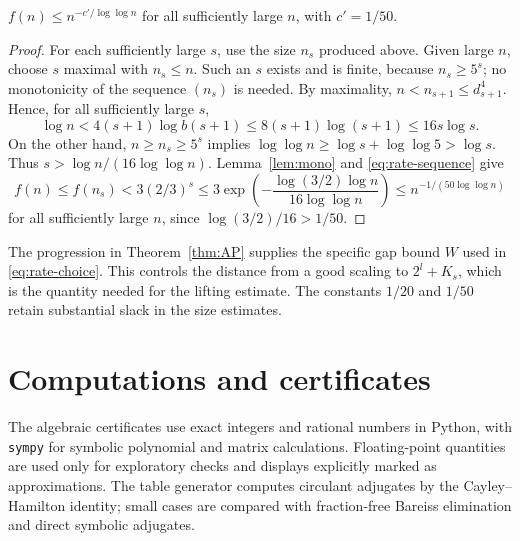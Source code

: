 \documentclass[12pt]{article}
\begin{document}
\begin{corollary}\label{cor:rate-all}
$f(n)\le n^{-c'/\log\log n}$ for all sufficiently large $n$, with $c'=1/50$.
\end{corollary}
\begin{proof}
For each sufficiently large $s$, use the size $n_s$ produced above.
Given large $n$, choose $s$ maximal with $n_s\le n$.
Such an $s$ exists and is finite, because $n_s\ge5^s$; no monotonicity of the
sequence $(n_s)$ is needed. By maximality,
$n<n_{s+1}\le d_{s+1}^4$. Hence, for all sufficiently large $s$,
\[
\log n<4(s+1)\log b(s+1)
\le8(s+1)\log(s+1)\le16s\log s.
\]
On the other hand, $n\ge n_s\ge5^s$ implies
$\log\log n\ge\log s+\log\log5>\log s$.
Thus $s>\log n/(16\log\log n)$.
Lemma~\ref{lem:mono} and \eqref{eq:rate-sequence} give
\[
f(n)\le f(n_s)<3(2/3)^s
\le3\exp\left(-\frac{\log(3/2)\log n}{16\log\log n}\right)
\le n^{-1/(50\log\log n)}
\]
for all sufficiently large $n$, since $\log(3/2)/16>1/50$.
\end{proof}

The progression in Theorem~\ref{thm:AP} supplies the specific gap bound $W$
used in \eqref{eq:rate-choice}. This controls the distance from a good scaling
to $2^l+K_s$, which is the quantity needed for the lifting estimate.
The constants $1/20$ and $1/50$ retain substantial slack in the size estimates.

\section{Computations and certificates}\label{sec:comp}

The algebraic certificates use exact integers and rational numbers in Python, with \texttt{sympy} for symbolic
polynomial and matrix calculations. Floating-point quantities are used only for exploratory checks and displays
explicitly marked as approximations. The table generator computes circulant adjugates by the Cayley--Hamilton
identity; small cases are compared with fraction-free Bareiss elimination and direct symbolic adjugates.
\end{document}
